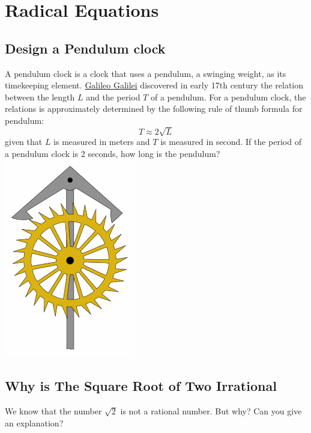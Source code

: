 \documentclass[en,12pt]{elegantbook}
\let\BeginKnitrBlock\begin \let\EndKnitrBlock\end
\begin{document}
\hypertarget{radical-equations}{%
\chapter{Radical Equations}\label{radical-equations}}

\hypertarget{design-a-pendulum-clock}{%
\section{Design a Pendulum clock}\label{design-a-pendulum-clock}}

A pendulum clock is a clock that uses a pendulum, a swinging weight, as its timekeeping element. \href{https://en.wikipedia.org/wiki/Galileo_Galilei}{Galileo Galilei} discovered in early 17th century the relation between the length \(L\) and the period \(T\) of a pendulum. For a pendulum clock, the relations is approximately determined by the following rule of thumb formula for pendulum:
\[
T\approx 2\sqrt{L}
\]
given that \(L\) is measured in meters and \(T\) is measured in second. If the period of a pendulum clock is 2 seconds, how long is the pendulum?\\

\includegraphics{figs/pendulum-clock.gif}\\

\hypertarget{why-is-the-square-root-of-two-irrational}{%
\section{Why is The Square Root of Two Irrational}\label{why-is-the-square-root-of-two-irrational}}

\BeginKnitrBlock{rmdthink}
We know that the number \(\sqrt{2}\) is not a rational number. But why? Can you give an explanation?
\EndKnitrBlock{rmdthink}
\end{document}
